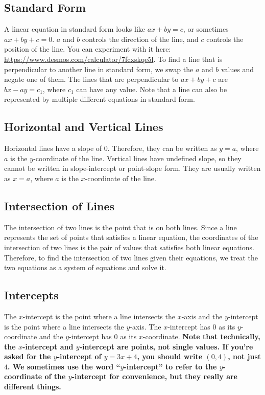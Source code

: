 \documentclass{article}
\begin{document}
    \subsection*{Standard Form}
    A linear equation in standard form looks like $ax + by = c$, or sometimes $ax + by + c = 0$. $a$ and $b$ controls the direction of the line, and $c$ controls the position of the line. You can experiment with it here: \url{https://www.desmos.com/calculator/7fcxskqe5l}. To find a line that is perpendicular to another line in standard form, we swap the $a$ and $b$ values and negate one of them. The lines that are perpendicular to $ax + by + c$ are $bx - ay = c_1$, where $c_1$ can have any value. Note that a line can also be represented by multiple different equations in standard form.
    \subsection*{Horizontal and Vertical Lines}
    Horizontal lines have a slope of $0$. Therefore, they can be written as $y = a$, where $a$ is the $y$-coordinate of the line. Vertical lines have undefined slope, so they cannot be written in slope-intercept or point-slope form. They are usually written as $x = a$, where $a$ is the $x$-coordinate of the line.
    \subsection*{Intersection of Lines}
    The intersection of two lines is the point that is on both lines. Since a line represents the set of points that satisfies a linear equation, the coordinates of the intersection of two lines is the pair of values that satisfies both linear equations. Therefore, to find the intersection of two lines given their equations, we treat the two equations as a system of equations and solve it.
    \subsection*{Intercepts}
    The $x$-intercept is the point where a line intersects the $x$-axis and the $y$-intercept is the point where a line intersects the $y$-axis. The $x$-intercept has $0$ as its $y$-coordinate and the $y$-intercept has $0$ as its $x$-coordinate. \textbf{Note that technically, the $x$-intercept and $y$-intercept are points, not single values. If you're asked for the $y$-intercept of $y = 3x + 4$, you should write $(0, 4)$, not just $4$. We sometimes use the word ``$y$-intercept'' to refer to the $y$-coordinate of the $y$-intercept for convenience, but they really are different things.}
\end{document}
